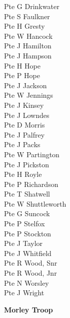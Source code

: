 \begin{multicols}{3}
  Pte G Drinkwater \\
  Pte S Faulkner \\
  Pte H Gresty \\
  Pte W Hancock \\
  Pte J Hamilton \\
  Pte J Hampson \\
  Pte H Hope \\
  Pte P Hope \\
  Pte J Jackson \\
  Pte W Jennings \\
  Pte J Kinsey \\
  Pte J Lowndes \\
  Pte D Morris \\
  Pte J Palfrey \\
  Pte J Packs \\
  Pte W Partington \\
  Pte J Pickston \\
  Pte H Royle \\
  Pte P Richardson \\
  Pte T Shatwell \\
  Pte W Shuttleworth \\
  Pte G Suncock \\
  Pte P Stelfox \\
  Pte P Stockton \\
  Pte J Taylor \\
  Pte J Whitfield \\
  Pte R Wood, Snr \\
  Pte R Wood, Jnr \\
  Pte N Worsley \\
  Pte J Wright \\
\end{multicols}

\vspace*{10mm}

\pagebreak

\begin{center}
  \Large
  \textbf{Morley Troop}
\end{center}

